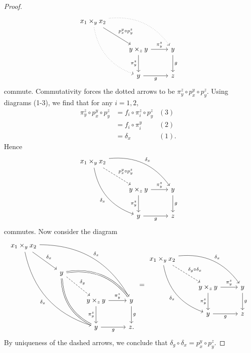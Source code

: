 \begin{proof}
\[\begin{tikzcd}[row sep = 2.5em, column sep = 2.5em]
		x_1\times _yx_2 \ar[dotted, bend left, drr] \ar[dotted, bend right, ddr] \ar[" p_x^y\circ p_y^z ", dr]  &  &  \\
	 & y\times _zy \ar[" \pi _y^z ", r] \ar[" \pi _y^z "', d]  & y\ar[" g ", d]  \\
	 & y\ar[" g "', r]  & z
	\end{tikzcd}\]
	commute. Commutativity forces the dotted arrows to be $\pi _y^z \circ p_x^y \circ p_y^z$. Using diagrams (1-3), we find that for any $i=1,2$,
	\begin{align*}
		\pi _y^z \circ p_x^y \circ p_y^z &= f_i \circ \pi _i^z \circ p_y^z & (3) \\
						 &=f_i \circ \pi _i^y & (2)\\
						 &=\delta _x  & (1)
	.\end{align*}
	Hence
	\[\begin{tikzcd}[row sep = 2.5em, column sep = 2.5em]
		x_1\times _yx_2 \ar[" \delta _x ", bend left, drr] \ar[" \delta _x "', bend right, ddr] \ar[" p_x^y\circ p_y^z ", dashed, dr]  &  &  \\
	 & y\times _zy \ar[" \pi _y^z ", r] \ar[" \pi _y^z "', d]  & y\ar[" g ", d]  \\
	 & y\ar[" g "', r]  & z
	\end{tikzcd}\]
	commutes. Now consider the diagram
	\[\begin{tikzcd}[row sep = 2.5em, column sep = 2.5em]
	x_1\times _yx_2 \ar[" \delta _x ", dr] \ar[" \delta _x ", bend left, ddrrr] \ar[" \delta _x "', bend right, dddrr]  &  &  &  \\
															  & y \ar[" \delta _g ", dashed, dr] \ar[equals, bend left, drr] \ar[equals, bend right, ddr]  &  &  \\
	 & & y\times _zy \ar[" \pi _y^z ", r] \ar[" \pi _y^z "', d]  & y\ar[" g ", d]  \\
	 & &  y \ar[" g "', r]  & z.
	\end{tikzcd} = \begin{tikzcd}[row sep = 2.5em, column sep = 2.5em]
		x_1\times _yx_2 \ar[" \delta _x ", bend left, drr] \ar[" \delta _x "', bend right, ddr] \ar[" \delta _g\circ \delta _x ", dashed, dr]  &  &  \\
	 & y\times _zy \ar[" \pi _y^z ", r] \ar[" \pi _y^z "', d]  & y\ar[" g ", d]  \\
	 & y\ar[" g "', r]  & z
	\end{tikzcd}\]
	By uniqueness of the dashed arrows, we conclude that $\delta _g \circ \delta _x = p_x^y \circ p_y^z$.


\end{proof}

